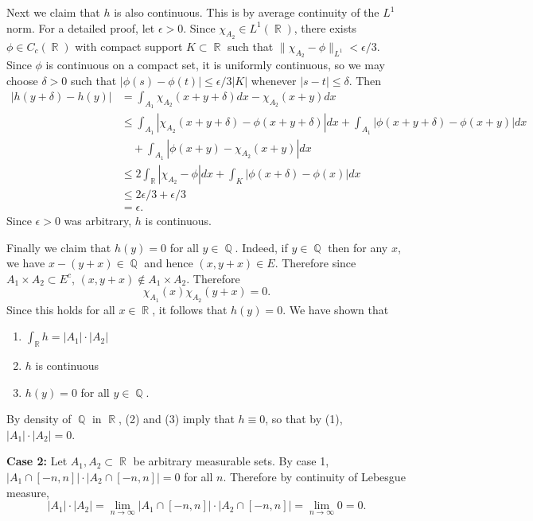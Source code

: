 \documentclass[answers]{exam}
\DeclareMathOperator{\RR}{\mathbb{R}}
\DeclareMathOperator{\QQ}{\mathbb{Q}}
\begin{document}
\begin{questions}
\begin{solution}
  Next we claim that $h$ is also continuous. This is by average continuity of the $L^{1}$ norm. For a detailed proof, let $\epsilon>0$. Since $\chi_{A_{2}}\in L^{1}(\RR)$, there exists $\phi\in C_{c}(\RR)$ with compact support $K\subset \RR$ such that $ \| \chi_{A_{2}}-\phi \|_{L^{1}}<\epsilon/3$. Since $\phi$ is continuous on a compact set, it is uniformly continuous, so we may choose $\delta>0$ such that $|\phi(s)-\phi(t)|\leq\epsilon/3|K|$ whenever $|s-t|\leq\delta$. Then
  \begin{align*}
    |h(y+\delta)-h(y)|
    &= \int_{A_{1}}\chi_{A_{2}}(x+y+\delta)dx - \chi_{A_{2}}(x+y)dx\\
    &\leq \int_{A_{1}}|\chi_{A_{2}}(x+y+\delta) -\phi(x+y+\delta)|dx +\int_{A_{1}}|\phi(x+y+\delta)-\phi(x+y)|dx\\
    &\quad+\int_{A_{1}}|\phi(x+y) - \chi_{A_{2}}(x+y)|dx\\
    &\leq 2\int_{\RR}|\chi_{A_{2}} -\phi|dx +\int_{K}|\phi(x+\delta)-\phi(x)|dx\\
    &\leq 2\epsilon/3 + \epsilon/3\\
    &= \epsilon.
  \end{align*}
  Since $\epsilon>0$ was arbitrary, $h$ is continuous.

  Finally we claim that $h(y)=0$ for all $y\in \QQ$. Indeed, if $y\in \QQ$ then for any $x$, we have $x-(y+x)\in \QQ$ and hence $(x,y+x)\in E$. Therefore since $A_{1}\times A_{2}\subset E^{c}$, $(x,y+x)\notin A_{1}\times A_{2}$. Therefore 
  \begin{equation*}
    \chi_{A_{1}}(x)\chi_{A_{2}}(y+x)=0.
  \end{equation*}
  Since this holds for all $x\in \RR$, it follows that $h(y)= 0$.
  We have shown that
  \begin{enumerate}
  \item $\int_{\RR} h = |A_{1}|\cdot |A_{2}|$
  \item $h$ is continuous
  \item $h(y) = 0$ for all $y\in \QQ$.
  \end{enumerate}
  By density of $\QQ$ in $\RR$, (2) and (3) imply that $h\equiv 0$, so that by (1), $|A_{1}|\cdot |A_{2}| = 0$.

  \textbf{Case 2:} Let $A_{1},A_{2}\subset \RR$ be arbitrary measurable sets. By case 1,  $|A_{1}\cap [-n,n]|\cdot |A_{2}\cap [-n,n]| =0$ for all $n$. Therefore by continuity of Lebesgue measure,
  \begin{equation*}
    |A_{1}|\cdot|A_{2}| = \lim_{n\to\infty}|A_{1}\cap [-n,n]|\cdot |A_{2}\cap [-n,n]| =\lim_{n\to\infty}0=0.
  \end{equation*}
\end{solution}







\end{questions}
\end{document}
